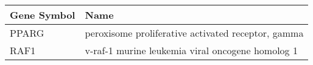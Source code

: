 \begin{tabular}{ll}
\toprule
Gene Symbol &                                               Name \\
\midrule
      PPARG & peroxisome proliferative activated receptor, gamma \\
       RAF1 &   v-raf-1 murine leukemia viral oncogene homolog 1 \\
\bottomrule
\end{tabular}
